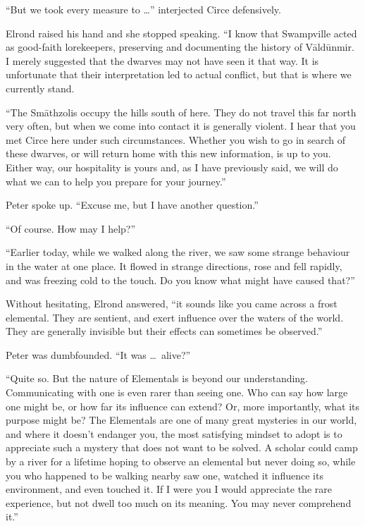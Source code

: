 ``But we took every measure to \ldots'' interjected Circe defensively.

Elrond raised his hand and she stopped speaking.  ``I know that Swampville acted as good-faith lorekeepers, preserving and documenting the history of V\=ald\=unmir.  I merely suggested that the dwarves may not have seen it that way.  It is unfortunate that their interpretation led to actual conflict, but that is where we currently stand.

``The Sm\=athzolis occupy the hills south of here.  They do not travel this far north very often, but when we come into contact it is generally violent.  I hear that you met Circe here under such circumstances.  Whether you wish to go in search of these dwarves, or will return home with this new information, is up to you.  Either way, our hospitality is yours and, as I have previously said, we will do what we can to help you prepare for your journey.''

Peter spoke up.  ``Excuse me, but I have another question.''

``Of course.  How may I help?''

``Earlier today, while we walked along the river, we saw some strange behaviour in the water at one place.  It flowed in strange directions, rose and fell rapidly, and was freezing cold to the touch.  Do you know what might have caused that?''

Without hesitating, Elrond answered, ``it sounds like you came across a frost elemental.  They are sentient, and exert influence over the waters of the world.  They are generally invisible but their effects can sometimes be observed.''

Peter was dumbfounded.  ``It was \ldots\ alive?''

``Quite so.  But the nature of Elementals is beyond our understanding.  Communicating with one is even rarer than seeing one.  Who can say how large one might be, or how far its influence can extend?  Or, more importantly, what its purpose might be?  The Elementals are one of many great mysteries in our world, and where it doesn't endanger you, the most satisfying mindset to adopt is to appreciate such a mystery that does not want to be solved.  A scholar could camp by a river for a lifetime hoping to observe an elemental but never doing so, while you who happened to be walking nearby saw one, watched it influence its environment, and even touched it.  If I were you I would appreciate the rare experience, but not dwell too much on its meaning.  You may never comprehend it.''

